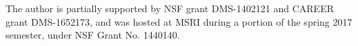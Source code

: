 \documentclass[brochure,english,12pt]{bourbaki}%
\begin{document}
The author is partially supported by NSF grant DMS-1402121 and CAREER grant DMS-1652173, and was hosted at MSRI during a portion of the spring 2017 semester, under NSF Grant No. 1440140.






%
%
\end{document}
